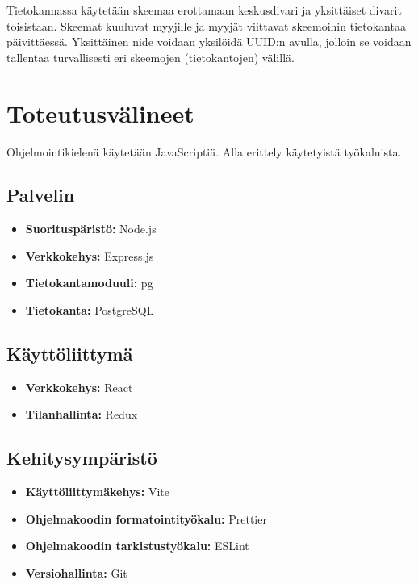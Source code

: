 \documentclass[11pt,a4paper]{article}
\begin{document}
Tietokannassa käytetään skeemaa erottamaan keskusdivari ja yksittäiset divarit toisistaan. Skeemat kuuluvat myyjille ja myyjät viittavat skeemoihin tietokantaa päivittäessä. Yksittäinen nide voidaan yksilöidä UUID:n avulla, jolloin se voidaan tallentaa turvallisesti eri skeemojen (tietokantojen) välillä.

\section{Toteutusvälineet}

Ohjelmointikielenä käytetään JavaScriptiä. Alla erittely käytetyistä työkaluista.

\subsection{Palvelin}

\begin{itemize}
	\item \textbf{Suorituspäristö:} Node.js
	\item \textbf{Verkkokehys:} Express.js
	\item \textbf{Tietokantamoduuli:} pg
	\item \textbf{Tietokanta:} PostgreSQL
\end{itemize}

\subsection{Käyttöliittymä}

\begin{itemize}
	\item \textbf{Verkkokehys:} React
	\item \textbf{Tilanhallinta:} Redux
\end{itemize}

\subsection{Kehitysympäristö}

\begin{itemize}
	\item \textbf{Käyttöliittymäkehys:} Vite
	\item \textbf{Ohjelmakoodin formatointityökalu:} Prettier
	\item \textbf{Ohjelmakoodin tarkistustyökalu:} ESLint
	\item \textbf{Versiohallinta:} Git
\end{itemize}
\end{document}
